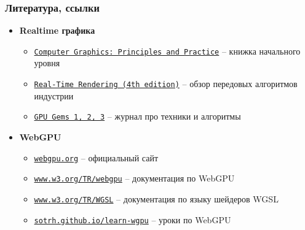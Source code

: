 \documentclass[10pt]{beamer}
\begin{document}
\begin{frame}
\frametitle{Литература, ссылки}
\begin{itemize}
\item \textbf{Realtime графика}
\begin{itemize}
\item \href{https://cgpp.net/about.xml}{\texttt{Computer Graphics: Principles and Practice}} -- книжка начального уровня
\item \href{https://www.amazon.com/Real-Time-Rendering-Fourth-Tomas-Akenine-M\%C3\%B6ller/dp/1138627003}{\texttt{Real-Time Rendering (4th edition)}} -- обзор передовых алгоритмов индустрии
\item \href{https://developer.nvidia.com/gpugems}{\texttt{GPU Gems 1, 2, 3}} -- журнал про техники и алгоритмы
\end{itemize}
\item \textbf{WebGPU}
\begin{itemize}
\item \href{https://webgpu.org}{\nolinkurl{webgpu.org}} -- официальный сайт
\item \href{https://www.w3.org/TR/webgpu}{\nolinkurl{www.w3.org/TR/webgpu}} -- документация по WebGPU
\item \href{https://www.w3.org/TR/WGSL}{\nolinkurl{www.w3.org/TR/WGSL}} -- документация по языку шейдеров WGSL
\item \href{https://sotrh.github.io/learn-wgpu/}{\nolinkurl{sotrh.github.io/learn-wgpu}} -- уроки по WebGPU
\end{itemize}
\end{itemize}
\end{frame}
\end{document}
